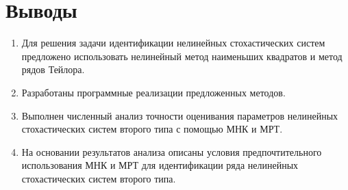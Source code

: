 \section{Выводы}

\begin{enumerate}
\item Для решения задачи идентификации нелинейных стохастических систем
  предложено использовать нелинейный метод наименьших квадратов
  и метод рядов Тейлора.
\item Разработаны программные реализации предложенных методов.
\item Выполнен численный анализ точности оценивания параметров
  нелинейных стохастических систем второго типа с помощью МНК и МРТ.
\item На основании результатов анализа описаны условия
  предпочтительного использования МНК и МРТ для
  идентификации ряда нелинейных стохастических систем второго типа.
\end{enumerate}